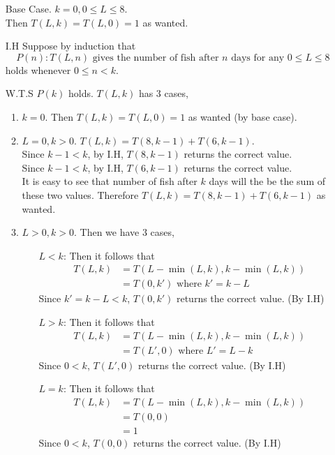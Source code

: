 \documentclass{article}
\begin{document}
    \begin{enumerate}
        \item [Base Case.] \(k = 0, 0 \leq L \leq 8\).\\ 
        Then \(T(L,k) = T(L,0) = 1\) as wanted.
        \item[I.H] Suppose by induction that
        \begin{equation}
            P(n): T(L,n) \textrm{ gives the number of fish after } n \textrm{ days for any } 0 \leq L \leq 8
        \end{equation}
        holds whenever \(0 \leq n < k\).
        \item [W.T.S] \(P(k)\) holds.
        \(T(L,k)\) has 3 cases,
        \begin{enumerate}
            \item \(k = 0\). Then \(T(L,k) = T(L,0) = 1\) as wanted (by base case).
            \item \(L = 0, k > 0\). \(T(L,k) = T(8, k -1) + T(6, k - 1)\).\\
            Since \(k - 1 < k\), by I.H, \(T(8, k - 1)\) returns the correct value.\\
            Since \(k - 1 < k\), by I.H, \(T(6, k - 1)\) returns the correct value.\\
            It is easy to see that number of fish after \(k\) days will the be
            the sum of these two values. Therefore \(T(L,k) = T(8, k -1) + T(6, k - 1)\) as wanted.
            \item \(L > 0, k > 0\). Then we have 3 cases,
            \begin{enumerate}
                \item[\(L < k\):] Then it follows that 
                \begin{align}
                    T(L,k) &= T(L - \min(L,k), k - \min(L,k))\\ 
                    &=T(0,k') \textrm{ where } k' = k - L
                \end{align}
                Since \(k' = k - L < k\), \(T(0,k')\) returns the correct value. (By I.H)
                \item[\(L > k\):] Then it follows that 
                \begin{align}
                    T(L,k) &= T(L - \min(L,k), k - \min(L,k))\\ 
                    &=T(L',0) \textrm{ where } L' = L - k
                \end{align}
                Since \(0 < k\), \(T(L',0)\) returns the correct value. (By I.H)
                \item[\(L = k\):] Then it follows that 
                \begin{align}
                    T(L,k) &= T(L - \min(L,k), k - \min(L,k))\\ 
                    &=T(0,0)\\
                    & = 1
                \end{align}
                Since \(0 < k\), \(T(0,0)\) returns the correct value. (By I.H)


\end{enumerate}
\end{enumerate}
\end{enumerate}
\end{document}
